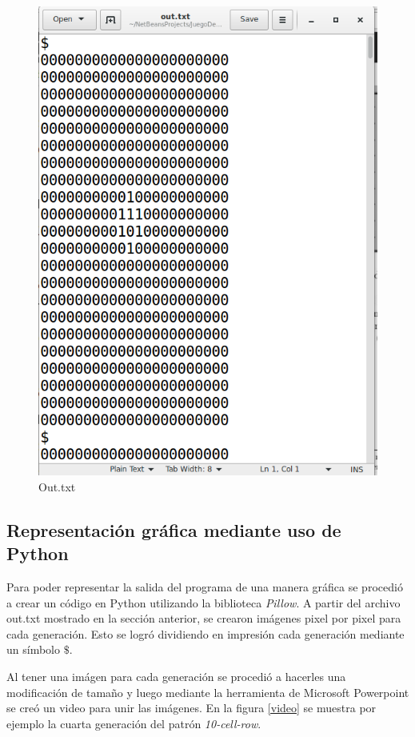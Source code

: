 \documentclass[12pt,letterpaper]{article}
\begin{document}
\begin{figure}[H]
\centering
\includegraphics[height=12 cm, width=12cm]{img/outtxt.png}
\caption{\label{outtxt} Out.txt}
\end{figure}


\newpage 
\subsection{Representación gráfica mediante uso de Python}
Para poder representar la salida del programa de una manera gráfica se procedió a crear un código en Python utilizando la biblioteca \textit{Pillow}. A partir del archivo out.txt mostrado en la sección anterior, se crearon imágenes pixel por pixel para cada generación. Esto se logró dividiendo en impresión cada generación mediante un símbolo $\$$. 

Al tener una imágen para cada generación se procedió a hacerles una modificación de tamaño y luego mediante la herramienta de Microsoft Powerpoint se creó un video para unir las imágenes. En la figura \ref{video} se muestra por ejemplo la cuarta generación del patrón \textit{10-cell-row}.
\end{document}
